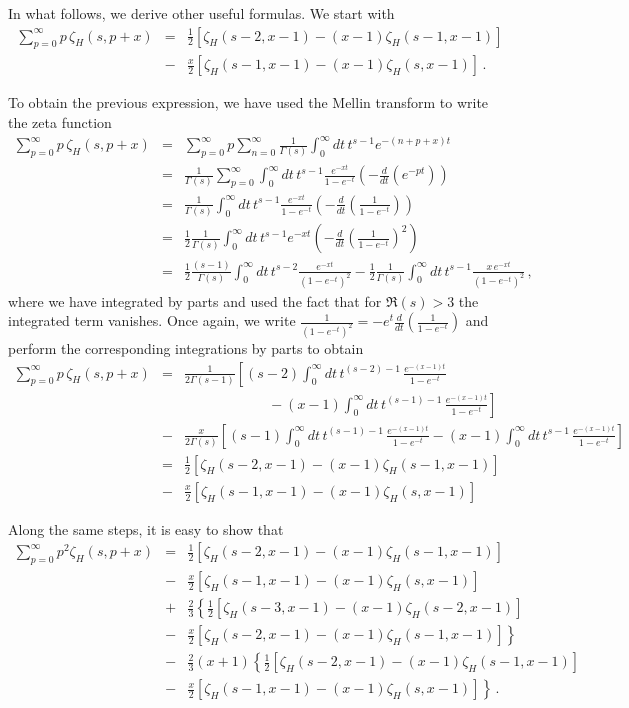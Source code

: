 \documentclass[12pt,a4paper]{article}
\newcommand{\beq}{\begin{eqnarray}}
\newcommand{\eeq}{\end{eqnarray}}
\newcommand{\nn}{\nonumber}
\numberwithin{equation}{section}
\begin{document}
In what follows, we derive other useful formulas. We start with
\beq
\sum_{p=0}^{\infty}  p \, \zeta_H (s,p+x) &=& \frac12 \left[\zeta_H (s-2,x-1) - (x-1) \zeta_H (s-1, x-1)\right] \nn \\
&-&\frac x2 \left[\zeta_H (s-1,x-1) - (x-1) \zeta_H (s, x-1)\right] \,.\label{a26}\eeq

To obtain the previous expression, we have used the Mellin transform to write the zeta function
\beq
\sum_{p=0}^{\infty}  p \, \zeta_H (s,p+x) &=& \sum_{p=0}^{\infty}  p \sum_{n=0}^{\infty} \frac{1}{\Gamma(s)}\int_0^{\infty}dt\,t^{s-1}e^{-(n+p+x)t}\nn\\
&=&\frac{1}{\Gamma(s)}\sum_{p=0}^{\infty}\int_0^{\infty}dt\,t^{s-1} \frac{e^{-xt}}{1-e^{-t}}\left(-\frac{d}{dt}(e^{-pt})\right)\nn\\
&=&\frac{1}{\Gamma(s)}\int_0^{\infty}dt\,t^{s-1} \frac{e^{-xt}}{1-e^{-t}}\left(-\frac{d}{dt}\left(\frac{1}{1-e^{-t}}\right)\right)\nn\\
&=&\frac{1}{2} \frac{1}{\Gamma(s)}\int_0^{\infty}dt\,t^{s-1} {e^{-xt}}\left(-\frac{d}{dt}\left(\frac{1}{1-e^{-t}}\right)^2 \right)\nn\\
&=&\frac{1}{2} \frac{(s-1)}{\Gamma(s)}\int_0^{\infty}dt\,t^{s-2} \frac{e^{-xt}}{(1-e^{-t})^2} -
\frac{1}{2} \frac{1}{\Gamma(s)}\int_0^{\infty}dt\,t^{s-1}\frac{x\, e^{-xt}}{(1-e^{-t})^2}\,,\nn
\eeq
where we have integrated by parts and used the fact that for $\Re(s)>3$ the integrated term vanishes. Once again, we write $\frac{1}{(1-e^{-t})^2}=-e^t\frac{d}{dt}\left(\frac{1}{1-e^{-t}}\right)$ and perform the corresponding integrations by parts to obtain
\beq
\sum_{p=0}^{\infty}  p \, \zeta_H (s,p+x) &=&\frac{1}{2 \Gamma(s-1)}\left[(s-2)\int_0^{\infty}dt\,t^{(s-2)-1}\, \frac{e^{-(x-1)t}}{1-e^{-t}}\right.\nn\\
&&\left.\qquad\qquad\qquad- (x-1)\int_0^{\infty}dt\,t^{(s-1)-1}\, \frac{e^{-(x-1)t}}{1-e^{-t}}\right]\nn\\
&-&\frac{x}{2 \Gamma(s)}\left[(s-1)\int_0^{\infty}dt\,t^{(s-1)-1}\, \frac{e^{-(x-1)t}}{1-e^{-t}}- (x-1)\int_0^{\infty}dt\,t^{s-1} \,\frac{e^{-(x-1)t}}{1-e^{-t}}\right]\nn\\
&=&\frac12 \left[\zeta_H (s-2,x-1) - (x-1) \zeta_H (s-1, x-1)\right] \nn \\
&-&\frac x2 \left[\zeta_H (s-1,x-1) - (x-1) \zeta_H (s, x-1)\right]\nn
\eeq


 Along the same steps, it is easy to show that
\beq
\sum_{p=0}^{\infty}  p^2 \zeta_H (s,p+x) &=&
\frac12 [\zeta_H (s-2,x-1)-(x-1)\zeta_H (s-1,x-1)]\nn\\&-&\frac{x}{2} [\zeta_H (s-1,x-1)-(x-1)\zeta_H (s,x-1)]\nn \\
&+&\frac23\left\{\frac12 [\zeta_H (s-3,x-1)-(x-1)\zeta_H (s-2,x-1)]\right. \nn \\&-&\left.\frac{x}{2} [\zeta_H (s-2,x-1)-(x-1)\zeta_H (s-1,x-1)]\right\}\nn \\
&-&\frac23(x+1)\left\{\frac12 [\zeta_H (s-2,x-1)-(x-1)\zeta_H (s-1,x-1)]\right. \nn \\&-&\left.\frac{x}{2} [\zeta_H (s-1,x-1)-(x-1)\zeta_H (s,x-1)]\right\}\,.\label{a27}
\eeq
\end{document}
